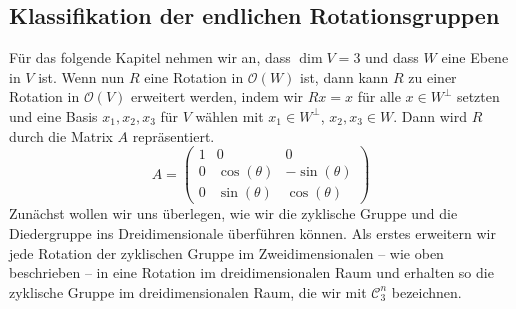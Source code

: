 \subsection{Klassifikation der endlichen Rotationsgruppen}
Für das folgende Kapitel nehmen wir an, dass $\dim V = 3$ und dass $W$ eine Ebene in $V$ ist. Wenn nun $R$ eine Rotation in $\mathcal{O}(W)$ ist, dann kann $R$ zu einer Rotation in $\mathcal{O}(V)$ erweitert werden, indem wir $Rx=x$ für alle $x \in W^\perp$ setzten und eine Basis ${x_1,x_2,x_3}$ für $V$ wählen mit $x_1 \in W^\perp$, $x_2, x_3 \in W$. Dann wird $R$ durch die Matrix $A$ repräsentiert.
$$A=\begin{pmatrix}
1 & 0 & 0 \\
    0 & \cos{(\theta)} & -\sin{(\theta)} \\
    0 & \sin{(\theta)} & \cos{(\theta)}
\end{pmatrix} $$ 
Zunächst wollen wir uns überlegen, wie wir die zyklische Gruppe und die Diedergruppe ins Dreidimensionale überführen können. Als erstes erweitern wir jede Rotation der zyklischen Gruppe im Zweidimensionalen -- wie oben beschrieben -- in eine Rotation im dreidimensionalen Raum und erhalten so die zyklische Gruppe im dreidimensionalen Raum, die wir mit $\mathcal{C}_3^n$ bezeichnen. 

